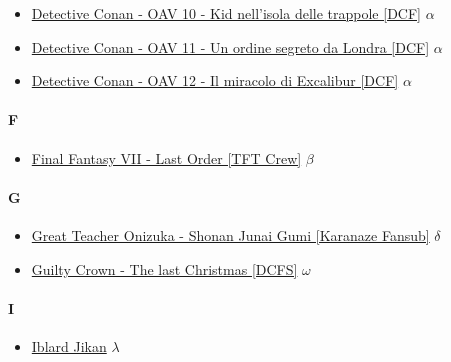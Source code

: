 \begin{itemize}
				\item \href{https://mega.nz/#!FQ9iHZib!mIVzoGiKR43tI_R5Q6W5mnL-ghuhdntoBuvyPOoKjHw} {Detective Conan - OAV 10 - Kid nell'isola delle trappole [DCF]}  $\alpha$   \\ 
				\item \href{https://mega.nz/#!MNtimAhC!XvaoCwqRVVdb30KPiosHoAw5Il8bybwLWaUytZiBEzg} {Detective Conan - OAV 11 - Un ordine segreto da Londra [DCF]}  $\alpha$   \\ 
				\item \href{https://mega.nz/#!kMERiLSb!lRnNxFeGIkbAV_H0cYfmrZ7VfanFr19jAvoyi9SqN8Q} {Detective Conan - OAV 12 - Il miracolo di Excalibur [DCF]}  $\alpha$   \\ 
			
			\end{itemize}
	
		\paragraph{F} \hypertarget{OF}{}
			\begin{itemize}
		
				\item \href{https://mega.nz/#!noxgQDIT!K0rkl0VO1eJ-id92CaGVfVEObWJeqPVYY5VBfFFOQUo} {Final Fantasy VII - Last Order [TFT Crew]}  $\beta$   \\ 
		
			\end{itemize}
	
	
		\paragraph{G} \hypertarget{OG}{}
			\begin{itemize}
				\item \href{https://mega.nz/#F!xBgCwLQI!NhK6fH7MbL10j8IzPq5FHg} {Great Teacher Onizuka - Shonan Junai Gumi [Karanaze Fansub]}   $\delta$  \\ 
				\item \href{https://mega.nz/#!MQlAxDaa!anHw_jrBUVrYJjZV13CjzqiMMXFmLW_MfilrDGNUtkw} {Guilty Crown - The last Christmas [DCFS]}   $\omega$  \\ 
			\end{itemize}
		
		\paragraph{I} \hypertarget{OI}{}
			\begin{itemize}
				\item \href{https://mega.nz/#!X8JWRQqY!uN64hLpm8NdSrxsfWNaWCYXRDhl_OX3KPJJHcAvZCqw} {Iblard Jikan}   $\lambda$  \\ 
			\end{itemize}
		

